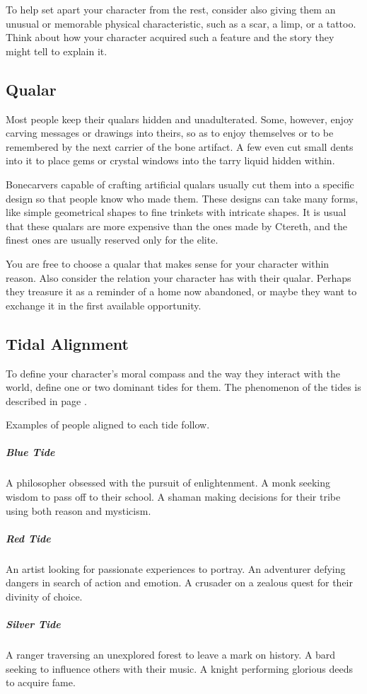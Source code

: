 To help set apart your character from the rest, consider also giving them an unusual or memorable physical characteristic, such as a scar, a limp, or a tattoo.
Think about how your character acquired such a feature and the story they might tell to explain it.

\subsection*{Qualar}
Most people keep their qualars hidden and unadulterated.
Some, however, enjoy carving messages or drawings into theirs, so as to enjoy themselves or to be remembered by the next carrier of the bone artifact.
A few even cut small dents into it to place gems or crystal windows into the tarry liquid hidden within.

Bonecarvers capable of crafting artificial qualars usually cut them into a specific design so that people know who made them.
These designs can take many forms, like simple geometrical shapes to fine trinkets with intricate shapes.
It is usual that these qualars are more expensive than the ones made by Ctereth, and the finest ones are usually reserved only for the elite.

You are free to choose a qualar that makes sense for your character within reason.
Also consider the relation your character has with their qualar.
Perhaps they treasure it as a reminder of a home now abandoned, or maybe they want to exchange it in the first available opportunity.

\subsection*{Tidal Alignment}
To define your character's moral compass and the way they interact with the world, define one or two dominant tides for them.
The phenomenon of the tides is described in page \pageref{ssec::tides}.

Examples of people aligned to each tide follow.

\subparagraph{Blue Tide} A philosopher obsessed with the pursuit of enlightenment.
A monk seeking wisdom to pass off to their school.
A shaman making decisions for their tribe using both reason and mysticism.

\subparagraph{Red Tide} An artist looking for passionate experiences to portray.
An adventurer defying dangers in search of action and emotion.
A crusader on a zealous quest for their divinity of choice.

\subparagraph{Silver Tide} A ranger traversing an unexplored forest to leave a mark on history.
A bard seeking to influence others with their music.
A knight performing glorious deeds to acquire fame.

